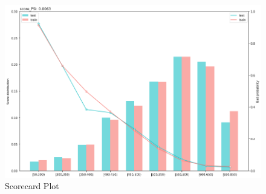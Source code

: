 \begin{landscape}
\begin{figure}[!ht]
\begin{center}
	\includegraphics[scale=0.70]{figs/scorecard_plot.png}
	\caption{Scorecard Plot \label{scorecard_plot}}
\end{center}
\end{figure}
\end{landscape} 
